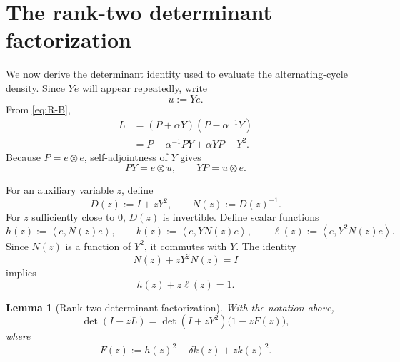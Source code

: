 \documentclass[11pt]{article}
\newtheorem{lemma}[theorem]{Lemma}
\newcommand{\ip}[2]{\left\langle #1,#2\right\rangle}
\begin{document}
\section{The rank-two determinant factorization}

We now derive the determinant identity used to evaluate the alternating-cycle density.
Since $Ye$ will appear repeatedly, write
\[
   u:=Ye.
\]
From \eqref{eq:R-B},
\begin{equation}
\begin{aligned}
   L
   &=(P+\alpha Y)(P-\alpha^{-1}Y)\\
   &=P-\alpha^{-1}PY+\alpha YP-Y^2.
\end{aligned}
   \label{eq:L-expanded}
\end{equation}
Because $P=e\otimes e$, self-adjointness of $Y$ gives
\[
   PY=e\otimes u,
   \qquad
   YP=u\otimes e.
\]

For an auxiliary variable $z$, define
\begin{equation}
   D(z):=I+zY^2,
   \qquad
   N(z):=D(z)^{-1}.
   \label{eq:D-N}
\end{equation}
For $z$ sufficiently close to $0$, $D(z)$ is invertible.  Define scalar functions
\begin{equation}
   h(z):=\ip{e}{N(z)e},
   \qquad
   k(z):=\ip{e}{YN(z)e},
   \qquad
   \ell(z):=\ip{e}{Y^2N(z)e}.
   \label{eq:h-k-ell}
\end{equation}
Since $N(z)$ is a function of $Y^2$, it commutes with $Y$.  The identity
\[
   N(z)+zY^2N(z)=I
\]
implies
\begin{equation}
   h(z)+z\ell(z)=1.
   \label{eq:h-ell}
\end{equation}

\begin{lemma}[Rank-two determinant factorization]\label{lem:rank-two-factorization}
With the notation above,
\begin{equation}
   \det(I-zL)
   =\det(I+zY^2)\bigl(1-zF(z)\bigr),
   \label{eq:det-factor}
\end{equation}
where
\begin{equation}
   F(z):=h(z)^2-\delta k(z)+zk(z)^2.
   \label{eq:def-F}
\end{equation}
\end{lemma}
\end{document}

